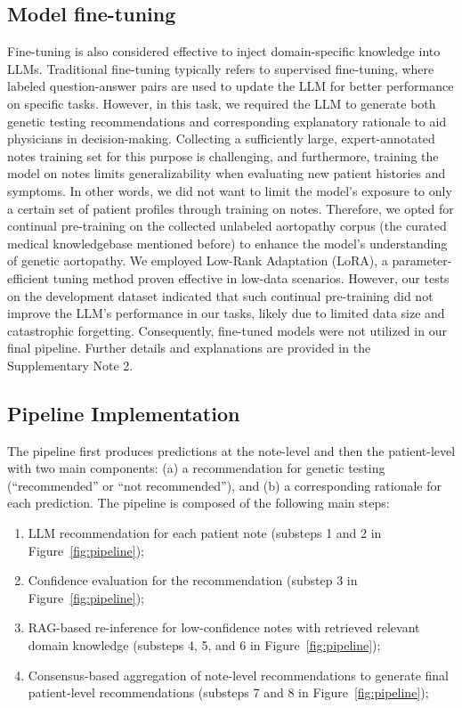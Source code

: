 \documentclass[fleqn,10pt]{wlscirep}
\begin{document}
\subsection*{Model fine-tuning}
Fine-tuning is also considered effective to inject domain-specific knowledge into LLMs.\cite{ovadia2023fine} Traditional fine-tuning typically refers to supervised fine-tuning, where labeled question-answer pairs are used to update the LLM for better performance on specific tasks. However, in this task, we required the LLM to generate both genetic testing recommendations and corresponding explanatory rationale to aid physicians in decision-making. Collecting a sufficiently large, expert-annotated notes training set for this purpose is challenging, and furthermore, training the model on notes limits generalizability when evaluating new patient histories and symptoms. In other words, we did not want to limit the model’s exposure to only a certain set of patient profiles through training on notes. Therefore, we opted for continual pre-training on the collected unlabeled aortopathy corpus (the curated medical knowledgebase mentioned before) to enhance the model’s understanding of genetic aortopathy. We employed Low-Rank Adaptation (LoRA), a parameter-efficient tuning method proven effective in low-data scenarios.\cite{hu2022lora} However, our tests on the development dataset indicated that such continual pre-training did not improve the LLM’s performance in our tasks, likely due to limited data size and catastrophic forgetting. Consequently, fine-tuned models were not utilized in our final pipeline. Further details and explanations are provided in the Supplementary Note 2.

\subsection*{Pipeline Implementation}

The pipeline first produces predictions at the note-level and then the patient-level with two main components: (a) a recommendation for genetic testing (“recommended” or “not recommended”), and (b) a corresponding rationale for each prediction. The pipeline is composed of the following main steps: 

\begin{enumerate}[label=(\roman*)]
    \setlength{\itemsep}{-2pt}
    \item LLM recommendation for each patient note (substeps 1 and 2 in Figure~\ref{fig:pipeline});
    \item Confidence evaluation for the recommendation (substep 3 in Figure~\ref{fig:pipeline});
    \item RAG-based re-inference for low-confidence notes with retrieved relevant domain knowledge (substeps 4, 5, and 6 in Figure~\ref{fig:pipeline});
    \item Consensus-based aggregation of note-level recommendations to generate final patient-level recommendations (substeps 7 and 8 in Figure~\ref{fig:pipeline});
\end{enumerate}
\end{document}
